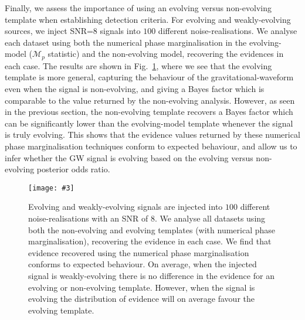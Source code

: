 \documentclass[prd,twocolumn,showpacs,nofootinbib]{revtex4}
\newcommand{\incgraph}[3]{\texttt{[image: \#3]}}
\begin{document}
Finally, we assess the importance of using an evolving versus non-evolving template when establishing detection criteria. For evolving and weakly-evolving sources, we inject SNR=8 signals into $100$ different noise-realisations. We analyse each dataset using both the numerical phase marginalisation in the evolving-model ($\mathcal{M}_p$ statistic) and the non-evolving model, recovering the evidences in each case. The results are shown in Fig.\ \ref{fig:EvNonEv_BayesDiff}, where we see that the evolving template is more general, capturing the behaviour of the gravitational-waveform even when the signal is non-evolving, and giving a Bayes factor which is comparable to the value returned by the non-evolving analysis. However, as seen in the previous section, the non-evolving template recovers a Bayes factor which can be significantly lower than the evolving-model template whenever the signal is truly evolving. %
This shows that the evidence values returned by these numerical phase marginalisation techniques conform to expected behaviour, and allow us to infer whether the GW signal is evolving based on the evolving versus non-evolving posterior odds ratio.

\begin{figure}[h]
  \centering
  \incgraph{0}{0.5}{Evolve_NonEvolve_TemplateCompare.png}
   \caption{\label{fig:EvNonEv_BayesDiff}Evolving and weakly-evolving signals are injected into $100$ different noise-realisations with an SNR of $8$. We analyse all datasets using both the non-evolving and evolving templates (with numerical phase marginalisation), recovering the evidence in each case. We find that evidence recovered using the numerical phase marginalisation conforms to expected behaviour. On average, when the injected signal is weakly-evolving there is no difference in the evidence for an evolving or non-evolving template. However, when the signal is evolving the distribution of evidence will on average favour the evolving template.}
 \end{figure}
\end{document}
